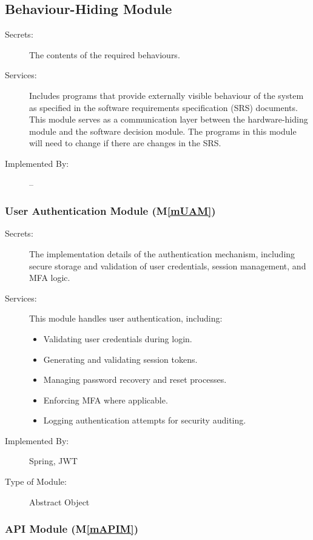 \documentclass[12pt, titlepage]{article}
\newcommand{\mref}[1]{M\ref{#1}}
\begin{document}
\subsection{Behaviour-Hiding Module}

\begin{description}
\item[Secrets:]The contents of the required behaviours.
\item[Services:]Includes programs that provide externally visible behaviour of the system as specified in the software requirements specification (SRS) documents. This module serves as a communication layer between the hardware-hiding module and the software decision module. The programs in this module will need to change if there are changes in the SRS.
\item[Implemented By:] --
\end{description}

\subsubsection{User Authentication Module (\mref{mUAM})} 

\begin{description}
\item[Secrets:] The implementation details of the authentication mechanism, including secure storage and validation of user credentials, session management, and MFA logic.
\item[Services:] This module handles user authentication, including:
\begin{itemize}
    \item Validating user credentials during login.
    \item Generating and validating session tokens.
    \item Managing password recovery and reset processes.
    \item Enforcing MFA where applicable.
    \item Logging authentication attempts for security auditing.
\end{itemize}
\item[Implemented By:] Spring, JWT
\item[Type of Module:] Abstract Object
\end{description}

\subsubsection{API Module (\mref{mAPIM})}
\end{document}
